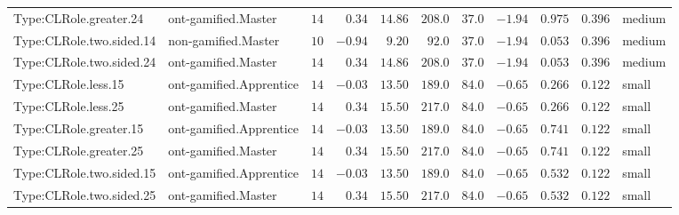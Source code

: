 \documentclass[6pt,a4paper]{article}
\begin{document}
{\begin{longtable}{llrrrrrrrrl}
Type:CLRole.greater.24&ont-gamified.Master&$14$&$ 0.34$&$14.86$&$208.0$&$ 37.0$&$-1.94$&$0.975$&$0.396$&medium\tabularnewline
Type:CLRole.two.sided.14&non-gamified.Master&$10$&$-0.94$&$ 9.20$&$ 92.0$&$ 37.0$&$-1.94$&$0.053$&$0.396$&medium\tabularnewline
Type:CLRole.two.sided.24&ont-gamified.Master&$14$&$ 0.34$&$14.86$&$208.0$&$ 37.0$&$-1.94$&$0.053$&$0.396$&medium\tabularnewline
Type:CLRole.less.15&ont-gamified.Apprentice&$14$&$-0.03$&$13.50$&$189.0$&$ 84.0$&$-0.65$&$0.266$&$0.122$&small\tabularnewline
Type:CLRole.less.25&ont-gamified.Master&$14$&$ 0.34$&$15.50$&$217.0$&$ 84.0$&$-0.65$&$0.266$&$0.122$&small\tabularnewline
Type:CLRole.greater.15&ont-gamified.Apprentice&$14$&$-0.03$&$13.50$&$189.0$&$ 84.0$&$-0.65$&$0.741$&$0.122$&small\tabularnewline
Type:CLRole.greater.25&ont-gamified.Master&$14$&$ 0.34$&$15.50$&$217.0$&$ 84.0$&$-0.65$&$0.741$&$0.122$&small\tabularnewline
\newpage
Type:CLRole.two.sided.15&ont-gamified.Apprentice&$14$&$-0.03$&$13.50$&$189.0$&$ 84.0$&$-0.65$&$0.532$&$0.122$&small\tabularnewline
Type:CLRole.two.sided.25&ont-gamified.Master&$14$&$ 0.34$&$15.50$&$217.0$&$ 84.0$&$-0.65$&$0.532$&$0.122$&small\tabularnewline
\hline
\end{longtable}}
\end{document}
